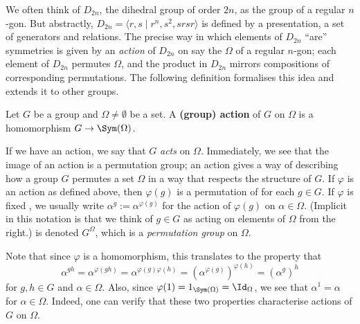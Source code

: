 
We often think of $D_{2n}$, the dihedral group of order $2n$, as the  group of a regular $n$-gon. But abstractly, \mbox{$D_{2n} = \langle r,s \mid r^n,s^2,srsr \rangle$} is defined by a presentation, a set of generators and relations. The precise way in which elements of $D_{2n}$ ``are'' symmetries is given by an \textit{action} of $D_{2n}$ on say the  $\Omega$ of a regular $n$-gon; each element of $D_{2n}$ permutes $\Omega$, and the product in $D_{2n}$ mirrors compositions of corresponding permutations. The following definition formalises this idea and extends it to other groups.

\begin{definition}\label{def:action}
    Let $G$ be a group and $\Omega \neq \emptyset$ be a set. A \textbf{(group) action} of $G$ on $\Omega$ is a homomorphism $G \to \Sym(\Omega)$. 
\end{definition}

If we have an action, we say that $G$ \textit{acts} on $\Omega$. Immediately, we see that the image of an action is a permutation group; an action gives a way of describing how a group $G$ permutes a set $\Omega$ in a way that respects the structure of $G$. If $\varphi$ is an action as defined above, then $\varphi(g)$ is a permutation of  for each $g \in G$. If $\varphi$ is fixed , we usually write $\alpha^g := \alpha^{\varphi(g)}$ for the action of $\varphi(g)$ on $\alpha \in \Omega$. (Implicit in this notation is that we think of $g \in G$ as acting on elements of $\Omega$ from the right.)  is denoted $G^\Omega$, which is a \textit{permutation group} on $\Omega$. 

Note that since $\varphi$ is a homomorphism, this translates to the property that
$$\alpha^{gh} = \alpha^{\varphi(gh)} = \alpha^{\varphi(g)\varphi(h)} = (\alpha^{\varphi(g)})^{\varphi(h)} = (\alpha^g)^h$$
for $g,h \in G$ and $\alpha \in \Omega$. Also, since $\varphi(1) = 1_{\Sym(\Omega)} = \Id_\Omega$, we see that $\alpha^1 = \alpha$ for $\alpha \in \Omega$. Indeed, one can verify that these two properties characterise actions of $G$ on $\Omega$.

